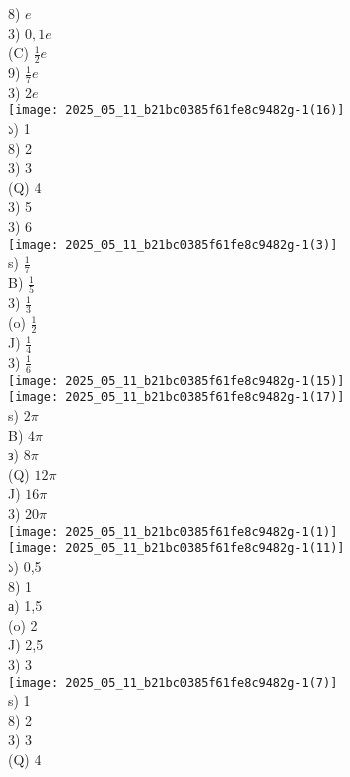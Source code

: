 \documentclass[10pt]{article}
\begin{document}
8) $e$\\
3) $0,1 e$\\
(C) $\frac{1}{2} e$\\
9) $\frac{1}{7} e$\\
3) $2 e$\\
\texttt{[image: 2025\_05\_11\_b21bc0385f61fe8c9482g-1(16)]}\\
১) 1\\
8) 2\\
3) 3\\
(Q) 4\\
3) 5\\
3) 6\\
\texttt{[image: 2025\_05\_11\_b21bc0385f61fe8c9482g-1(3)]}\\
s) $\frac{1}{7}$\\
B) $\frac{1}{5}$\\
3) $\frac{1}{3}$\\
(o) $\frac{1}{2}$\\
J) $\frac{1}{4}$\\
3) $\frac{1}{6}$\\
\texttt{[image: 2025\_05\_11\_b21bc0385f61fe8c9482g-1(15)]}\\
\texttt{[image: 2025\_05\_11\_b21bc0385f61fe8c9482g-1(17)]}\\
s) $2 \pi$\\
B) $4 \pi$\\
з) $8 \pi$\\
(Q) $12 \pi$\\
J) $16 \pi$\\
3) $20 \pi$\\
\texttt{[image: 2025\_05\_11\_b21bc0385f61fe8c9482g-1(1)]}\\
\texttt{[image: 2025\_05\_11\_b21bc0385f61fe8c9482g-1(11)]}\\
১) 0,5\\
8) 1\\
а) 1,5\\
(o) 2\\
J) 2,5\\
3) 3\\
\texttt{[image: 2025\_05\_11\_b21bc0385f61fe8c9482g-1(7)]}\\
s) 1\\
8) 2\\
3) 3\\
(Q) 4\\
\end{document}
